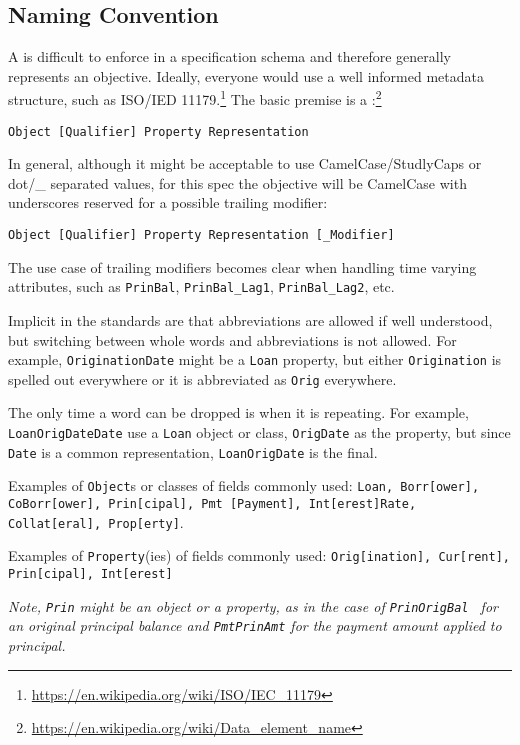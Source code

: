 \documentclass[10pt]{article}
\begin{document}
\fi

\subsection{Naming Convention\label{naming_convention}}

A  is difficult to enforce in a specification schema and therefore generally represents an objective.
Ideally, everyone would use a well informed metadata structure, such as ISO/IED 11179.\footnote{\url{https://en.wikipedia.org/wiki/ISO/IEC\_11179}}
The basic premise is a :\footnote{\url{https://en.wikipedia.org/wiki/Data\_element\_name}}
\begin{Verbatim}[formatcom=\color{red}]
Object [Qualifier] Property Representation
\end{Verbatim}
In general, although it might be acceptable to use CamelCase/StudlyCaps or dot/\_ separated values, for this spec the objective will be
CamelCase with underscores reserved for a possible trailing modifier:
\begin{Verbatim}[formatcom=\color{red}]
Object [Qualifier] Property Representation [_Modifier]
\end{Verbatim}
The use case of trailing modifiers becomes clear when handling time varying
attributes, such as {\tt PrinBal}, {\tt PrinBal\_Lag1}, {\tt PrinBal\_Lag2},
etc.

Implicit in the standards are that abbreviations are allowed if well understood, but switching between whole words and abbreviations is
not allowed. For example, {\tt OriginationDate} might be a {\tt Loan} property, but either {\tt Origination} is spelled out everywhere
or it is abbreviated as {\tt Orig} everywhere.

The only time a word can be dropped is when it is repeating. For example, {\tt LoanOrigDateDate} use a {\tt Loan} object or class,
{\tt OrigDate} as the property, but since {\tt Date} is a common representation, {\tt LoanOrigDate} is the final.


Examples of {\tt Object}s or classes of fields commonly used: {\tt Loan, Borr[ower], CoBorr[ower], Prin[cipal], Pmt [Payment],
Int[erest]Rate, Collat[eral], Prop[erty]}.

Examples of {\tt Property}(ies) of fields commonly used: {\tt Orig[ination], Cur[rent], Prin[cipal], Int[erest]} \par
{\em Note, {\tt Prin} might be an object or a property, as in the case of {\tt PrinOrigBal } for an original principal balance 
and {\tt PmtPrinAmt} for the payment amount applied to principal.}
\end{document}
